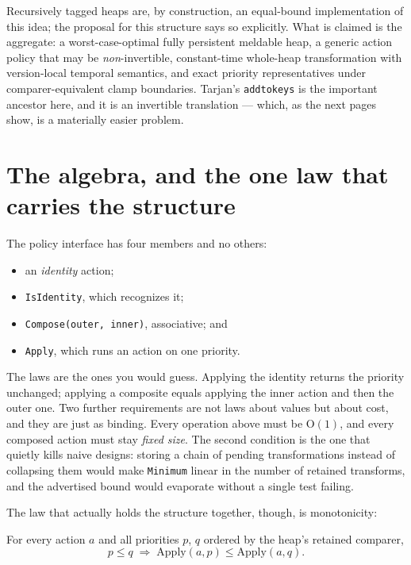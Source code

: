 \documentclass[11pt,twoside,openright]{book}
\newcommand{\code}[1]{\texorpdfstring{\textcolor{d7ink}{\texttt{#1}}}{#1}}
\newcommand{\term}[1]{\textit{#1}}
\newcommand{\bigoh}[1]{$\mathrm{O}(#1)$}
\begin{document}
\begin{asidebox}
Recursively tagged heaps are, by construction, an equal-bound implementation of
this idea; the proposal for this structure says so explicitly. What is claimed
is the aggregate: a worst-case-optimal fully persistent meldable heap, a generic
action policy that may be \emph{non}-invertible, constant-time whole-heap
transformation with version-local temporal semantics, and exact priority
representatives under comparer-equivalent clamp boundaries. Tarjan's
\code{addtokeys} is the important ancestor here, and it is an invertible
translation --- which, as the next pages show, is a materially easier problem.
\end{asidebox}

\section{The algebra, and the one law that carries the structure}

The policy interface has four members and no others:

\begin{itemize}
\item an \term{identity} action;
\item \code{IsIdentity}, which recognizes it;
\item \code{Compose(outer, inner)}, associative; and
\item \code{Apply}, which runs an action on one priority.
\end{itemize}

\noindent
The laws are the ones you would guess. Applying the identity returns the
priority unchanged; applying a composite equals applying the inner action and
then the outer one. Two further requirements are not laws about values but about
cost, and they are just as binding. Every operation above must be \bigoh{1}, and
every composed action must stay \emph{fixed size}. The second condition is the
one that quietly kills naive designs: storing a chain of pending transformations
instead of collapsing them would make \code{Minimum} linear in the number of
retained transforms, and the advertised bound would evaporate without a single
test failing.

The law that actually holds the structure together, though, is monotonicity:

\begin{contractbox}
For every action $a$ and all priorities $p$, $q$ ordered by the heap's retained
comparer,
\[ p \leq q \;\Longrightarrow\; \mathrm{Apply}(a, p) \leq \mathrm{Apply}(a, q). \]
\end{contractbox}
\end{document}

